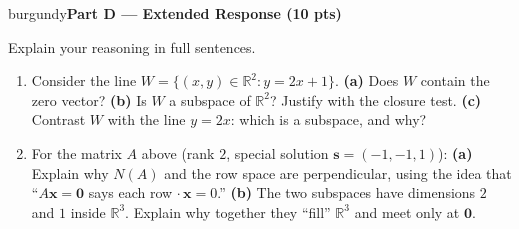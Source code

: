 \documentclass[10pt]{article}
\newcommand{\xx}{\mathbf{x}}
\newcommand{\zero}{\mathbf{0}}
\newcommand{\svec}{\mathbf{s}}
\newcommand{\parthead}[1]{%
  \vspace{6pt}\noindent
  \begin{headlinebox}{burgundy}{\color{white}\bfseries #1}\end{headlinebox}%
  \vspace{4pt}}
\begin{document}
\parthead{Part D --- Extended Response (10 pts)}
Explain your reasoning in full sentences.

\begin{enumerate}[leftmargin=1.9em, itemsep=16pt]
  \item Consider the line $W=\{(x,y)\in\mathbb{R}^2 : y=2x+1\}$.
        \textbf{(a)} Does $W$ contain the zero vector? \textbf{(b)} Is $W$ a subspace of $\mathbb{R}^2$?
        Justify with the closure test. \textbf{(c)} Contrast $W$ with the line $y=2x$: which is a
        subspace, and why?
        \vspace{3.0cm}
  \item For the matrix $A$ above (rank $2$, special solution $\svec=(-1,-1,1)$):
        \textbf{(a)} Explain why $N(A)$ and the row space are perpendicular, using the idea that
        ``$A\xx=\zero$ says each row $\cdot\,\xx=0$.'' \textbf{(b)} The two subspaces have dimensions
        $2$ and $1$ inside $\mathbb{R}^3$. Explain why together they ``fill'' $\mathbb{R}^3$ and meet only
        at $\zero$.
        \vspace{2.8cm}
\end{enumerate}
\end{document}
